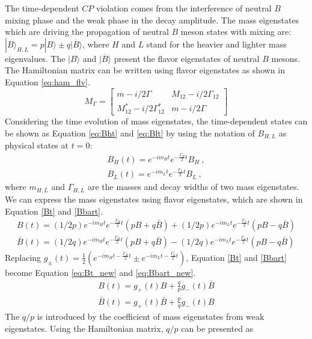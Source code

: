 The time-dependent $CP$ violation comes from the interference of neutral $B$ mixing phase and the weak phase in the decay amplitude. The mass eigenstates which are driving the propagation of neutral $B$ meson states with mixing are: $|B\rangle_{H,L}=p|B\rangle \pm q|\overline{B}\rangle $, where $H$ and $L$ stand for the heavier and lighter mass eigenvalues. The $|B\rangle$ and $|\overline{B}\rangle$ present the flavor eigenstates of neutral $B$ mesons.
The Hamiltonian matrix can be written using flavor eigenstates as shown in Equation \ref{eq:ham_flv}.
\begin{equation}\label{eq:ham_flv}
M_\Gamma=
\begin{bmatrix}
m-i/2\Gamma & M_{12}-i/2\Gamma_{12}\\
M^*_{12}-i/2\Gamma^*_{12}& m-i/2\Gamma 
\end{bmatrix}
\end{equation}
Considering the time evolution of mass eigenstates, the time-dependent states can be shown as Equation \ref{eq:Bht} and \ref{eq:Blt} by using the notation of $B_{H,L}$ as physical states at $t = 0$:
\begin{eqnarray}
B_H(t)=e^{-im_Ht}e^{-\frac{\Gamma_H}{2}t}B_H \label{eq:Bht}~,\\
B_L(t)=e^{-im_Lt}e^{-\frac{\Gamma_L}{2}t}B_L\label{eq:Blt}~,
\end{eqnarray}
where $m_{H,L}$ and $\Gamma_{H,L}$ are the masses and decay widths of two mass eigenstates. We can express the mass eigenstates using flavor eigenstates, which are shown in Equation \ref{Bt} and \ref{Bbart}.
\begin{eqnarray}
B(t)=(1/2p)e^{-im_Ht}e^{-\frac{\Gamma_H}{2}t}(pB+q\bar{B})+(1/2p)e^{-im_Lt}e^{-\frac{\Gamma_L}{2}t}(pB-q\bar{B}) \label{Bt}\\
\bar{B}(t)=(1/2q)e^{-im_Ht}e^{-\frac{\Gamma_H}{2}t}(pB+q\bar{B})-(1/2q)e^{-im_Lt}e^{-\frac{\Gamma_L}{2}t}(pB-q\bar{B})\label{Bbart}
\end{eqnarray}
Replacing $g_{\pm}(t)=\frac{1}{2}(e^{-im_Ht-\frac{\Gamma_H}{2}t}\pm e^{-im_Lt-\frac{\Gamma_L}{2}t})$, Equation \ref{Bt} and \ref{Bbart} become Equation \ref{eq:Bt_new} and \ref{eq:Bbart_new}.
\begin{eqnarray}
B(t)=g_{+}(t)B +\frac{q}{p}g_{-}(t)\bar{B} \label{eq:Bt_new}\\
\bar{B}(t)=g_{+}(t)\bar{B} + \frac{p}{q}g_{-}(t){B}\label{eq:Bbart_new}
\end{eqnarray}
The $q/p$ is introduced by the coefficient of mass eigenstates from weak eigenstates. Using the Hamiltonian matrix, $q/p$ can be presented as

